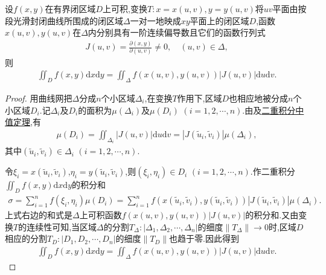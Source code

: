 \documentclass[../../main.tex]{subfiles}%
\begin{document}
\begin{theorem}\label{theorem:数分--定理21.13}
设$f(x,y)$在有界闭区域$D$上可积,变换$T:x=x(u,v),y=y(u,v)$将$uv$平面由按段光滑封闭曲线所围成的闭区域$\Delta$一对一地映成$xy$平面上的闭区域$D$,函数$x(u,v),y(u,v)$在$\Delta$内分别具有一阶连续偏导数且它们的函数行列式
\begin{align*}
J(u,v)=\frac{\partial(x,y)}{\partial(u,v)}\neq0,\quad(u,v)\in\Delta,
\end{align*}
则
\begin{align*}
\iint_{D}f(x,y)\mathrm{d}x\mathrm{d}y=\iint_{\Delta}f(x(u,v),y(u,v))|J(u,v)|\mathrm{d}u\mathrm{d}v.
\end{align*}
\end{theorem}
\begin{proof}

用曲线网把$\Delta$分成$n$个小区域$\Delta_i$,在变换$T$作用下,区域$D$也相应地被分成$n$个小区域$D_i$.记$\Delta_i$及$D_i$的面积为$\mu(\Delta_i)$及$\mu(D_i)$ $(i=1,2,\cdots,n)$.由及\hyperref[theorem:二重积分中值定理]{二重积分中值定理},有
\begin{align*}
\mu(D_i)=\iint_{\Delta_i}|J(u,v)|\mathrm{d}u\mathrm{d}v=|J(\tilde{u}_i,\tilde{v}_i)|\mu(\Delta_i),
\end{align*}
其中$(\tilde{u}_i,\tilde{v}_i)\in\Delta_i$ $(i=1,2,\cdots,n)$.

令$\xi_i=x(\tilde{u}_i,\tilde{v}_i)$,$\eta_i=y(\tilde{u}_i,\tilde{v}_i)$,则$(\xi_i,\eta_i)\in D_i$ $(i=1,2,\cdots,n)$.作二重积分$\iint_{D}f(x,y)\mathrm{d}x\mathrm{d}y$的积分和
\begin{align*}
\sigma=\sum_{i=1}^n f(\xi_i,\eta_i)\mu(D_i)=\sum_{i=1}^n f(x(\tilde{u}_i,\tilde{v}_i),y(\tilde{u}_i,\tilde{v}_i))|J(\tilde{u}_i,\tilde{v}_i)|\mu(\Delta_i).
\end{align*}
上式右边的和式是$\Delta$上可积函数$f(x(u,v),y(u,v))|J(u,v)|$的积分和.又由变换$T$的连续性可知,当区域$\Delta$的分割$T_{\Delta}:|\Delta_1,\Delta_2,\cdots,\Delta_n|$的细度$\|T_{\Delta}\|\to0$时,区域$D$相应的分割$T_D:|D_1,D_2,\cdots,D_n|$的细度$\|T_D\|$也趋于零.因此得到
\begin{align*}
\iint_{D}f(x,y)\mathrm{d}x\mathrm{d}y=\iint_{\Delta}f(x(u,v),y(u,v))|J(u,v)|\mathrm{d}u\mathrm{d}v.
\end{align*}

\end{proof}
\end{document}

